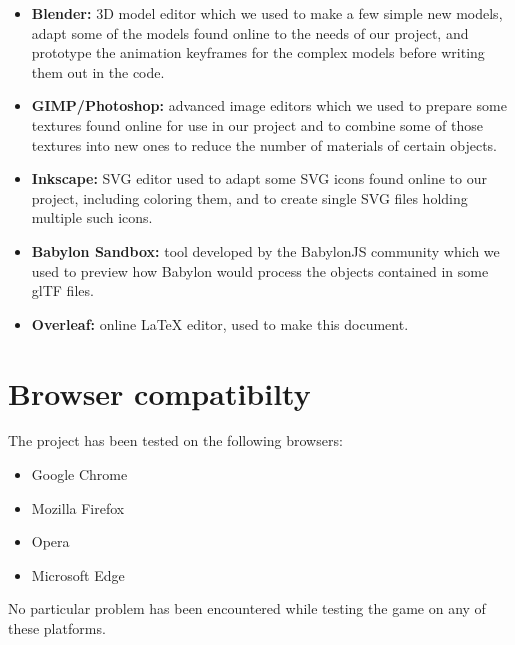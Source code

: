 \begin{itemize}
    \item \textbf{Blender:} 3D model editor which we used to make a few simple new models, adapt some of the models found online to the needs of our project, and prototype the animation keyframes for the complex models before writing them out in the code.
    \item \textbf{GIMP/Photoshop:} advanced image editors which we used to prepare some textures found online for use in our project and to combine some of those textures into new ones to reduce the number of materials of certain objects.
    \item \textbf{Inkscape:} SVG editor used to adapt some SVG icons found online to our project, including coloring them, and to create single SVG files holding multiple such icons.
    \item \textbf{Babylon Sandbox:} tool developed by the BabylonJS community which we used to preview how Babylon would process the objects contained in some glTF files.
    \item \textbf{Overleaf:} online LaTeX editor, used to make this document.
\end{itemize}

\section{Browser compatibilty}

The project has been tested on the following browsers:

\begin{itemize}
    \item Google Chrome
    \item Mozilla Firefox
    \item Opera
    \item Microsoft Edge
\end{itemize}

No particular problem has been encountered while testing the game on any of these platforms.